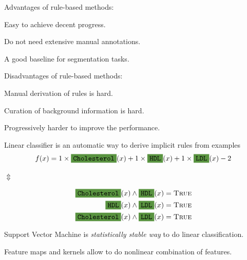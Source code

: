\documentclass[landscape,footrule]{foils}
\begin{document}

Advantages of rule-based methods:
\begin{triangles}
\item Easy to achieve decent progress.
\item Do not need extensive manual annotations.
\item A good baseline for segmentation tasks.   
\end{triangles}
\vspace*{2cm}

Disadvantages of rule-based methods:
\begin{triangles}
\item Manual derivation of rules is hard.
\item Curation of background information is hard.
\item Progressively harder to improve the performance. 
\end{triangles}
\vspace*{3ex}



Linear classifier is an automatic way to derive implicit rules from examples
\begin{align*}
f(x)=1\times \colorbox{OliveGreen!80}{\texttt{Cholesterol}}(x) + 1\times \colorbox{OliveGreen!80}{\texttt{HDL}}(x) + 1\times\colorbox{OliveGreen!80}{\texttt{LDL}}(x) - 2 
\end{align*}  
\centerline{$\Updownarrow$}
\begin{align*}
\colorbox{OliveGreen!80}{\texttt{Cholesterol}}(x) \wedge \colorbox{OliveGreen!80}{\texttt{HDL}}(x)&=\textsc{True}\\
\colorbox{OliveGreen!80}{\texttt{HDL}}(x) \wedge \colorbox{OliveGreen!80}{\texttt{LDL}}(x)&=\textsc{True}\\
\colorbox{OliveGreen!80}{\texttt{Cholesterol}}(x) \wedge \colorbox{OliveGreen!80}{\texttt{LDL}}(x)&=\textsc{True}
\end{align*}

Support Vector Machine is \emph{statistically stable way} to do linear classification.

\begin{triangles}
\item Feature maps and kernels allow to do nonlinear combination of features.
\end{triangles}
\end{document}
